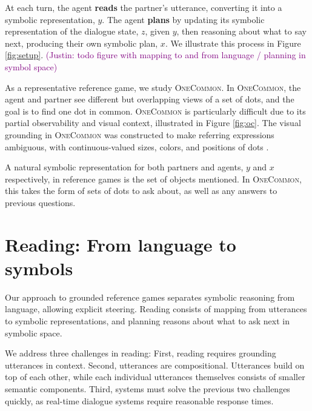 \documentclass[11pt]{article}
\newcommand{\justin}[1]{{{\textcolor{purple}{(Justin: #1)}}}}
\begin{document}
At each turn, the agent \textbf{reads} the partner's utterance, converting it into a symbolic representation, $y$.
The agent \textbf{plans} by updating its symbolic representation of the dialogue state, $z$, given $y$,
then reasoning about what to say next, producing their own symbolic plan, $x$.
We illustrate this process in Figure \ref{fig:setup}.
\justin{todo figure with mapping to and from language / planning in symbol space}

As a representative reference game, we study \textsc{OneCommon}.
In \textsc{OneCommon}, the agent and partner see different but overlapping views of a set of dots, and the goal is to find one dot in common.
\textsc{OneCommon} is particularly difficult due to its partial observability and visual context,
illustrated in Figure \ref{fig:oc}.
The visual grounding in \textsc{OneCommon} was constructed to make referring expressions ambiguous, with continuous-valued sizes, colors, and positions of dots \citep{onecommon}.

A natural symbolic representation for both partners and agents, $y$ and $x$ respectively, in reference games is the set of objects mentioned.
In \textsc{OneCommon}, this takes the form of sets of dots to ask about, as well as any answers to previous questions.

\section{Reading: From language to symbols}
Our approach to grounded reference games separates symbolic reasoning from language, allowing explicit steering.
Reading consists of mapping from utterances to symbolic representations, and planning reasons about what to ask next in symbolic space.

We address three challenges in reading: First, reading requires grounding utterances in context. Second, utterances are compositional. Utterances build on top of each other, while each individual utterances themselves consists of smaller semantic components. Third, systems must solve the previous two challenges quickly, as real-time dialogue systems require reasonable response times.
\end{document}
